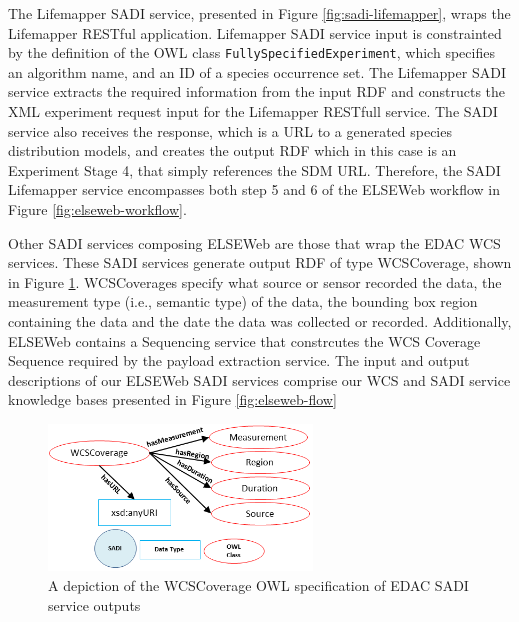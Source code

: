 \documentclass[letterpaper]{article}
\begin{document}
The Lifemapper SADI service, presented in Figure \ref{fig:sadi-lifemapper}, wraps the Lifemapper RESTful application. Lifemapper SADI service input is constrainted by the definition of the OWL class {\tt FullySpecifiedExperiment}, which specifies an algorithm name, and an ID of a species occurrence set. The Lifemapper SADI service extracts the required information from the input RDF and constructs the XML experiment request input for the Lifemapper RESTfull service. The SADI service also receives the response, which is a URL to a generated species distribution models, and creates the output RDF which in this case is an Experiment Stage 4, that simply references the SDM URL. Therefore, the SADI Lifemapper service encompasses both step 5 and 6 of the ELSEWeb workflow in Figure \ref{fig:elseweb-workflow}.

Other SADI services composing ELSEWeb are those that wrap the EDAC WCS services. These SADI services generate output RDF of type WCSCoverage, shown in Figure \ref{fig:wcscoverage-owl}. WCSCoverages specify what source or sensor recorded the data, the measurement type (i.e., semantic type) of the data, the bounding box region containing the data and the date the data was collected or recorded. Additionally, ELSEWeb contains a Sequencing service that constrcutes the WCS Coverage Sequence required by the payload extraction service. The input and output descriptions of our ELSEWeb SADI services comprise our WCS and SADI service knowledge bases presented in Figure \ref{fig:elseweb-flow}

\begin{figure}
\center
\includegraphics[width=70mm]{images/wcscoverage-owl.png}
\caption{A depiction of the WCSCoverage OWL specification of EDAC SADI service outputs}
\label{fig:wcscoverage-owl}
\end{figure}
\end{document}

